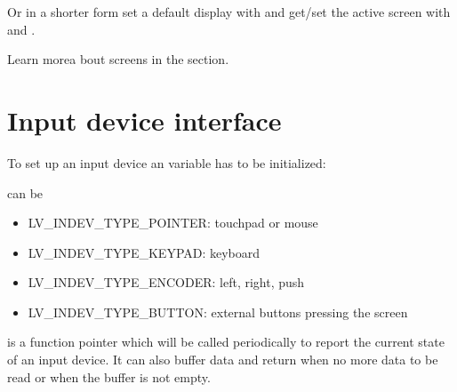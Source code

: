 \documentclass[letterpaper,10pt,english]{sphinxmanual}
\begin{document}
Or in a shorter form set a default display with  and get/set the active screen with  and .

Learn morea bout screens in the  section.


\section{Input device interface}
\label{\detokenize{porting/indev::doc}}\label{\detokenize{porting/indev:input-device-interface}}
To set up an input device an  variable has to be initialized:

%
\begin{sphinxVerbatim}[commandchars=\\\{\}]
   
 
 
  
\end{sphinxVerbatim}

 can be
\begin{itemize}
\item {} 
LV\_INDEV\_TYPE\_POINTER: touchpad or mouse

\item {} 
LV\_INDEV\_TYPE\_KEYPAD: keyboard

\item {} 
LV\_INDEV\_TYPE\_ENCODER: left, right, push

\item {} 
LV\_INDEV\_TYPE\_BUTTON: external buttons pressing the screen

\end{itemize}

 is a function pointer which will be called periodically to report the current state of an input device. It can also buffer data and return  when no more data to be read or  when the buffer is not empty.
\end{document}
